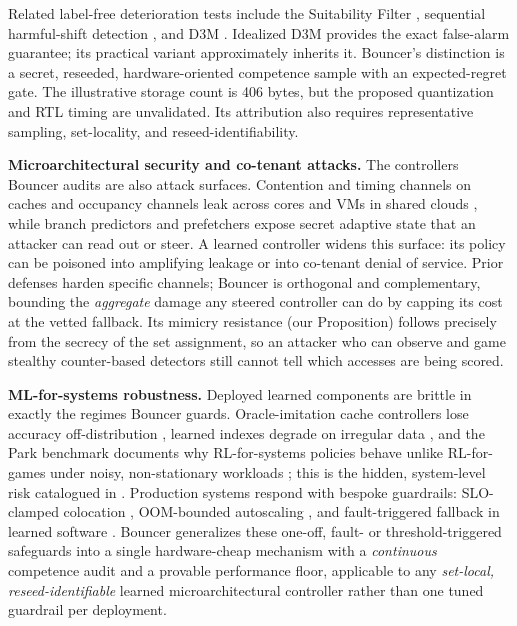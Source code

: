 Related label-free deterioration tests include the Suitability Filter
\citep{pouget2024suitability}, sequential harmful-shift detection
\citep{amoukou2024sequential}, and D3M \citep{d3m2024}. Idealized D3M provides the
exact false-alarm guarantee; its practical variant approximately inherits it.
Bouncer's distinction is a secret, reseeded, hardware-oriented competence sample
with an expected-regret gate. The illustrative storage count is 406 bytes, but
the proposed quantization and RTL timing are unvalidated. Its attribution also
requires representative sampling, set-locality, and reseed-identifiability.

\textbf{Microarchitectural security and co-tenant attacks.} The controllers Bouncer audits are also attack surfaces. Contention and timing channels on caches \citep{osvik2006cache, yarom2014flushreload, liu2015llc, gruss2016flushflush} and occupancy channels \citep{shusterman2019occupancy} leak across cores and VMs in shared clouds \citep{ristenpart2009heyyou}, while branch predictors \citep{evtyushkin2016jumpoveraslr, evtyushkin2018branchscope} and prefetchers \citep{gruss2016prefetch, guo2022adversarialprefetch} expose secret adaptive state that an attacker can read out or steer. A learned controller widens this surface: its policy can be poisoned into amplifying leakage or into co-tenant denial of service. Prior defenses harden specific channels; Bouncer is orthogonal and complementary, bounding the \emph{aggregate} damage any steered controller can do by capping its cost at the vetted fallback. Its mimicry resistance (our Proposition) follows precisely from the secrecy of the set assignment, so an attacker who can observe and game stealthy counter-based detectors \citep{gruss2016flushflush} still cannot tell which accesses are being scored.

\textbf{ML-for-systems robustness.} Deployed learned components are brittle in exactly the regimes Bouncer guards. Oracle-imitation cache controllers lose accuracy off-distribution \citep{liu2020imitationcache}, learned indexes degrade on irregular data \citep{marcus2020benchmarklearnedindex}, and the Park benchmark documents why RL-for-systems policies behave unlike RL-for-games under noisy, non-stationary workloads \citep{mao2019park}; this is the hidden, system-level risk catalogued in \citep{sculley2015technicaldebt}. Production systems respond with bespoke guardrails: SLO-clamped colocation \citep{lo2015heracles}, OOM-bounded autoscaling \citep{rzadca2020autopilot}, and fault-triggered fallback in learned software \citep{carstens2023smartchoices}. Bouncer generalizes these one-off, fault- or threshold-triggered safeguards into a single hardware-cheap mechanism with a \emph{continuous} competence audit and a provable performance floor, applicable to any \emph{set-local, reseed-identifiable} learned microarchitectural controller rather than one tuned guardrail per deployment.
